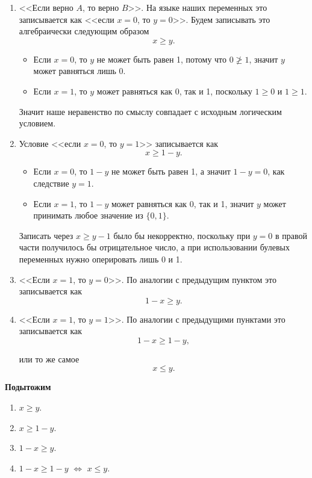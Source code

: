 \begin{enumerate}[nosep]
	\item <<Если верно $A$, то верно $B$>>. На языке наших переменных это записывается как <<если $x = 0$, то $y = 0$>>. Будем записывать это алгебраически следующим образом
	\[
	x \ge y.
	\]
	
	\begin{itemize}[nosep]
		\item Если $x = 0$, то $y$ не может быть равен 1, потому что $0 \ngeq 1$, значит $y$ может равняться лишь 0.
		
		\item Если $x = 1$, то $y$ может равняться как 0, так и 1, поскольку $1 \ge 0$ и $1 \ge 1$.
	\end{itemize}
	
	Значит наше неравенство по смыслу совпадает с исходным логическим условием.
	
	\item Условие <<если $x = 0$, то $y = 1$>> записывается как
	\[
	x \ge 1 - y.
	\]
	
	\begin{itemize}[nosep]
		\item Если $x = 0$, то $1-y$ не может быть равен 1, а значит $1-y=0$, как следствие $y = 1$.
		
		\item Если $x = 1$, то $1-y$ может равняться как 0, так и 1, значит $y$ может принимать любое значение из $\{0, 1\}$.
	\end{itemize}
	
	Записать через $x \ge y - 1$ было бы некорректно, поскольку при $y = 0$ в правой части получилось бы отрицательное число, а при использовании булевых переменных нужно оперировать лишь 0 и 1.
	
	\item <<Если $x = 1$, то $y = 0$>>. По аналогии с предыдущим пунктом это записывается как
	\[
	1-x \ge y.
	\]
	
	\item <<Если $x = 1$, то $y = 1$>>. По аналогии с предыдущими пунктами это записывается как
	\[
	1-x \ge 1 - y,
	\]
	
	или то же самое
	\[
	x \le y.
	\]
	
\end{enumerate}

\textbf{Подытожим}
\begin{enumerate}
	\item {} \qquad\qquad $x \ge y$.
	
	\item {} \qquad\qquad $x \ge 1 - y$.
	
	\item {} \qquad\qquad $1- x \ge y$.
	
	\item {} \qquad\qquad $1 - x \ge 1 - y$ \quad $\Longleftrightarrow$ \quad $x \le y$.
\end{enumerate}

